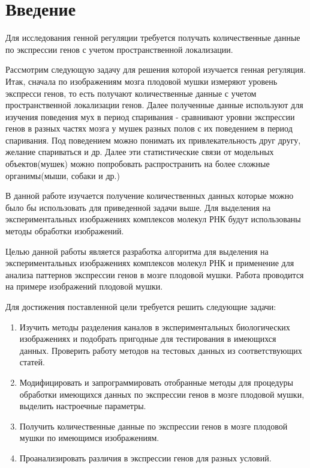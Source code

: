 \chapter*{Введение} %

Для исследования генной регуляции требуется получать количественные данные по экспрессии генов с учетом пространственной локализации.

Рассмотрим следующую задачу для решения которой изучается генная регуляция. Итак, сначала по изображениям мозга плодовой мушки измеряют уровень экспресси генов, то есть получают количественные данные с учетом пространственной локализации генов. Далее полученные данные используют для изучения поведения мух  в период спаривания - сравнивают уровни экспрессии генов в разных частях мозга у мушек разных полов с их поведением в период спаривания. Под поведением можно понимать их привлекательность друг другу, желание спариваться и др. Далее эти статистические связи от модельных объектов(мушек) можно попробовать распространить на более сложные органимы(мыши, собаки и др.)

В данной работе изучается получение количественных  данных которые можно было бы использовать для приведенной задачи выше. Для выделения на экспериментальных изображениях комплексов молекул РНК будут использованы методы обработки изображений.

Целью данной работы является разработка алгоритма для выделения на экспериментальных изображениях комплексов молекул РНК и применение для анализа паттернов экспрессии генов в мозге плодовой мушки. Работа проводится на примере изображений плодовой мушки.

Для достижения поставленной цели требуется решить следующие задачи:

\begin{enumerate}[1.]
	\item Изучить методы разделения каналов в экспериментальных биологических изображениях и подобрать пригодные для тестирования в имеющихся данных. Проверить работу методов на тестовых данных из соответствующих статей.
	\item Модифицировать и запрограммировать отобранные методы для процедуры обработки имеющихся данных по экспрессии генов в мозге плодовой мушки, выделить настроечные параметры.
	\item Получить количественные данные по экспрессии генов в мозге плодовой мушки по имеющимся изображениям.
	\item Проанализировать различия в экспрессии генов для разных условий.
\end{enumerate} 


